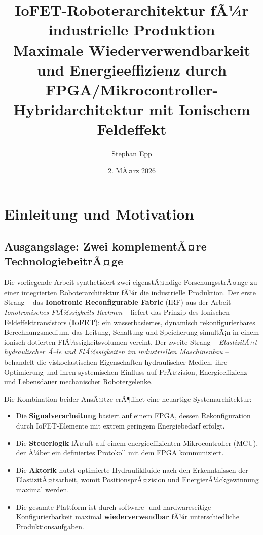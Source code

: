 ﻿\documentclass[a4paper,12pt]{scrreprt}
\title{%
  \textbf{IoFET-Roboterarchitektur fÃ¼r industrielle Produktion}\\[0.6em]
  \large Maximale Wiederverwendbarkeit und Energieeffizienz durch\\
  FPGA/Mikrocontroller-Hybridarchitektur mit Ionischem Feldeffekt}
\author{Stephan Epp}
\date{2. MÃ¤rz 2026}
\theoremstyle{definition}
\begin{document}
\maketitle
\tableofcontents
\newpage

\section{Einleitung und Motivation}

\subsection{Ausgangslage: Zwei komplementÃ¤re TechnologiebeitrÃ¤ge}

Die vorliegende Arbeit synthetisiert zwei eigenstÃ¤ndige ForschungsstrÃ¤nge
zu einer integrierten Roboterarchitektur fÃ¼r die industrielle Produktion.
Der erste Strang -- das \textbf{Ionotronic Reconfigurable Fabric} (IRF)
aus der Arbeit \emph{Ionotronisches FlÃ¼ssigkeits-Rechnen} -- liefert das
Prinzip des Ionischen Feldeffekttransistors (\textbf{IoFET}): ein
wasserbasiertes, dynamisch rekonfigurierbares Berechnungsmedium, das
Leitung, Schaltung und Speicherung simultÃ¡n in einem ionisch dotierten
FlÃ¼ssigkeitsvolumen vereint. Der zweite Strang -- \emph{ElastizitÃ¤t
hydraulischer Ã–le und FlÃ¼ssigkeiten im industriellen Maschinenbau} --
behandelt die viskoelastischen Eigenschaften hydraulischer Medien,
ihre Optimierung und ihren systemischen Einfluss auf PrÃ¤zision,
Energieeffizienz und Lebensdauer mechanischer Robotergelenke.

Die Kombination beider AnsÃ¤tze erÃ¶ffnet eine neuartige Systemarchitektur:
\begin{itemize}
  \item Die \textbf{Signalverarbeitung} basiert auf einem FPGA,
        dessen Rekonfiguration durch IoFET-Elemente mit extrem geringem
        Energiebedarf erfolgt.
  \item Die \textbf{Steuerlogik} lÃ¤uft auf einem energieeffizienten
        Mikrocontroller (MCU), der Ã¼ber ein definiertes Protokoll mit
        dem FPGA kommuniziert.
  \item Die \textbf{Aktorik} nutzt optimierte Hydraulikfluide nach den
        Erkenntnissen der ElastizitÃ¤tsarbeit, womit PositionsprÃ¤zision
        und EnergierÃ¼ckgewinnung maximal werden.
  \item Die gesamte Plattform ist durch software- und hardwareseitige
        Konfigurierbarkeit maximal \textbf{wiederverwendbar} fÃ¼r
        unterschiedliche Produktionsaufgaben.
\end{itemize}
\end{document}
